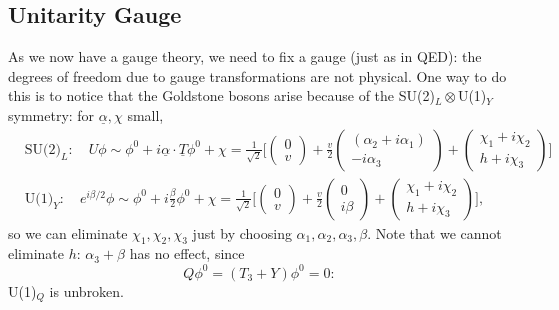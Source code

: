 \documentclass[a4paper,12pt]{article}
\begin{document}
\subsection{Unitarity Gauge}
%
As we now have a gauge theory, we need to fix a gauge (just as in QED): the degrees of freedom due to gauge transformations are not physical. One way to do this is to notice that the Goldstone bosons arise because of the SU(2)$_L \otimes$U(1)$_Y$ symmetry: for $\underline{\alpha}, \chi$ small, 
\begin{equation}
\begin{split}
&\text{SU(2)}_L: \quad U\phi \sim \phi^0 + i\underline{\alpha}\cdot \underline{T} \phi^0 + \chi = \frac{1}{\sqrt{2}} \bigg[ 
\begin{pmatrix}
0 \\ v
\end{pmatrix}
+ \frac{v}{2}
\begin{pmatrix}
(\alpha_2 + i \alpha_1) \\ -i\alpha_3
\end{pmatrix}
+ \begin{pmatrix}
\chi_1 + i \chi_2 \\ h + i \chi_3
\end{pmatrix} \bigg] \\
&\text{U(1)}_Y: \quad e^{i\beta /2}\phi \sim \phi^0 + i\frac{\beta}{2}\phi^0 + \chi = \frac{1}{\sqrt{2}} \bigg[ 
\begin{pmatrix}
0 \\ v
\end{pmatrix}
+ \frac{v}{2}
\begin{pmatrix}
0 \\ i\beta
\end{pmatrix}
+ \begin{pmatrix}
\chi_1 + i \chi_2 \\ h + i \chi_3
\end{pmatrix} \bigg],
\end{split}
\end{equation}
so we can eliminate $\chi_1, \chi_2, \chi_3$ just by choosing $\alpha_1, \alpha_2, \alpha_3, \beta$. Note that we cannot eliminate $h$: $\alpha_3 + \beta$ has no effect, since
\begin{equation}
Q \phi^0 = (T_3 + Y) \phi^0 = 0:
\end{equation}
U(1)$_Q$ is unbroken.
\end{document}
